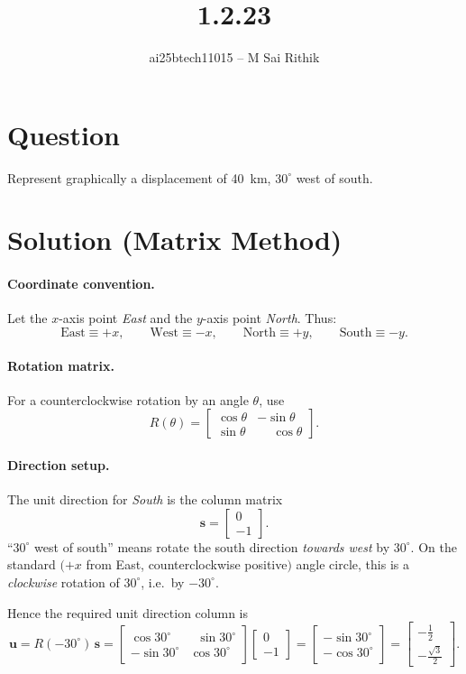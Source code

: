 \documentclass[12pt]{article}
\title{1.2.23}
\author{ai25btech11015 -- M Sai Rithik}
\date{}
\begin{document}
\maketitle

\section*{Question}
Represent graphically a displacement of \SI{40}{km}, $30^\circ$ west of south.

\section*{Solution (Matrix Method)}
\paragraph{Coordinate convention.}
Let the $x$-axis point \emph{East} and the $y$-axis point \emph{North}. Thus:
\[
\text{East} \equiv +x,\qquad
\text{West} \equiv -x,\qquad
\text{North} \equiv +y,\qquad
\text{South} \equiv -y.
\]

\paragraph{Rotation matrix.}
For a counterclockwise rotation by an angle $\theta$, use
\[
R(\theta)=
\begin{bmatrix}
\cos\theta & -\sin\theta\\
\sin\theta & \phantom{-}\cos\theta
\end{bmatrix}.
\]

\paragraph{Direction setup.}
The unit direction for \emph{South} is the column matrix
\[
\mathbf{s}=
\begin{bmatrix}
0\\
-1
\end{bmatrix}.
\]
``$30^\circ$ west of south'' means rotate the south direction \emph{towards west} by $30^\circ$.
On the standard $(+x$ from East, counterclockwise positive$)$ angle circle, this is a
\emph{clockwise} rotation of $30^\circ$, i.e.\ by $-30^\circ$.

Hence the required unit direction column is
\[
\mathbf{u}
=
R(-30^\circ)\,\mathbf{s}
=
\begin{bmatrix}
\cos 30^\circ & \;\;\sin 30^\circ\\[2pt]
-\sin 30^\circ & \cos 30^\circ
\end{bmatrix}
\begin{bmatrix}
0\\
-1
\end{bmatrix}
=
\begin{bmatrix}
-\sin 30^\circ\\[2pt]
-\cos 30^\circ
\end{bmatrix}
=
\begin{bmatrix}
-\tfrac{1}{2}\\[2pt]
-\tfrac{\sqrt{3}}{2}
\end{bmatrix}.
\]
\end{document}
